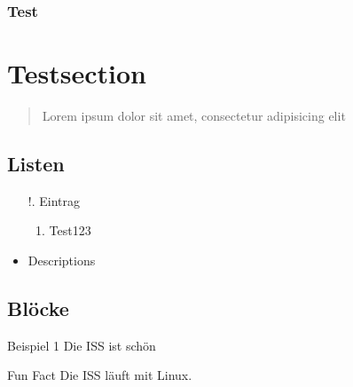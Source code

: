 
\begin{frame}
    \frametitle{Test}


    \section{Testsection}\label{sec:testsection}

    \begin{quote}
        Lorem ipsum dolor sit amet, consectetur adipisicing elit
    \end{quote}


    \subsection{Listen}\label{subsec:Listen}
    \begin{itemize}
        \item[!.] Eintrag
        \begin{enumerate}
            \item Test123
        \end{enumerate}
        \item Descriptions
    \end{itemize}

    \subsection{Blöcke}\label{subsec:Blocke}
    \begin{alertblock}{Beispiel 1}
        Die ISS ist schön
    \end{alertblock}
    \begin{exampleblock}{Fun Fact}
        Die ISS läuft mit Linux.
    \end{exampleblock}

\end{frame}